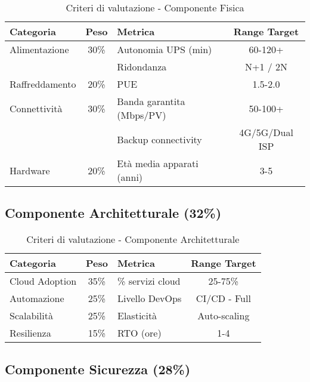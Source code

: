 \begin{table}[H]
\centering
\caption{Criteri di valutazione - Componente Fisica}
\small
\begin{tabular}{l c l c}
\toprule
\textbf{Categoria} & \textbf{Peso} & \textbf{Metrica} & \textbf{Range Target} \\
\midrule
Alimentazione & 30\% & Autonomia UPS (min) & 60-120+ \\
& & Ridondanza & N+1 / 2N \\
Raffreddamento & 20\% & PUE & 1.5-2.0 \\
Connettività & 30\% & Banda garantita (Mbps/PV) & 50-100+ \\
& & Backup connectivity & 4G/5G/Dual ISP \\
Hardware & 20\% & Età media apparati (anni) & 3-5 \\
\bottomrule
\end{tabular}
\end{table}

\subsection{\texorpdfstring{Componente Architetturale (32\%)}{B.3.2 - Componente Architetturale (32\%)}}

\begin{table}[H]
\centering
\caption{Criteri di valutazione - Componente Architetturale}
\small
\begin{tabular}{l c l c}
\toprule
\textbf{Categoria} & \textbf{Peso} & \textbf{Metrica} & \textbf{Range Target} \\
\midrule
Cloud Adoption & 35\% & \% servizi cloud & 25-75\% \\
Automazione & 25\% & Livello DevOps & CI/CD - Full \\
Scalabilità & 25\% & Elasticità & Auto-scaling \\
Resilienza & 15\% & RTO (ore) & 1-4 \\
\bottomrule
\end{tabular}
\end{table}

\subsection{\texorpdfstring{Componente Sicurezza (28\%)}{B.3.3 - Componente Sicurezza (28\%)}}

